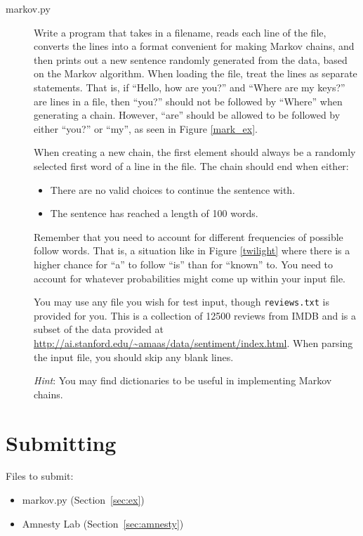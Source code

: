 \documentclass[11pt]{cselabheader}
\begin{document}
\begin{description}
\item[markov.py] Write a program that takes in a filename, reads each line of the file, converts the lines into a format convenient for making Markov chains, and then prints out a new sentence randomly generated from the data, based on the Markov algorithm. When loading the file, treat the lines as separate statements. That is, if ``Hello, how are you?'' and ``Where are my keys?'' are lines in a file, then ``you?'' should not be followed by ``Where'' when generating a chain. However, ``are'' should be allowed to be followed by either ``you?'' or ``my'', as seen in Figure \ref{mark_ex}.

  When creating a new chain, the first element should always be a randomly selected first word of a line in the file. The chain should end when either:
  \begin{itemize}
  \item There are no valid choices to continue the sentence with.
  \item The sentence has reached a length of 100 words.
  \end{itemize}

  Remember that you need to account for different frequencies of possible
  follow words. That is, a situation like in Figure \ref{twilight} where
  there is a higher chance for ``a'' to follow ``is'' than for ``known''
  to. You need to account for whatever probabilities might come up within
  your input file.

  You may use any file you wish for test input, though \lstinline{reviews.txt} is provided for you. This is a collection of 12500 reviews from IMDB and is a subset of the data provided at \url{http://ai.stanford.edu/~amaas/data/sentiment/index.html}. When parsing the input file, you should skip any blank lines.

  \emph{Hint}: You may find dictionaries to be useful in implementing
  Markov chains.

\end{description}


\pagebreak
\section{Submitting}

Files to submit:
\begin{itemize}
\item markov.py (Section~\ref{sec:ex})
\item Amnesty Lab (Section~\ref{sec:amnesty})
\end{itemize}
\end{document}
